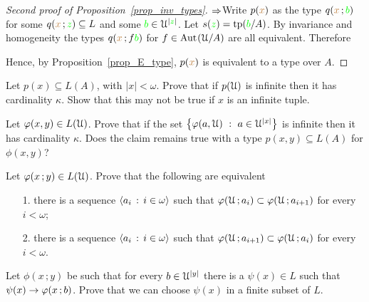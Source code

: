 \documentclass[creche.tex]{subfiles}
\begin{document}
\begin{proof}[Second proof of Proposition~\ref{prop_inv_types}] $\Rightarrow$\quad  Write $p({\color{brown} x})$ as the type $q({\color{brown} x}\,;{\color{green} b})$ for some $q({\color{brown} x}\,;{\color{green} z})\subseteq L$ and some ${\color{green} b}\in\EuScript U^{|{\color{green} z}|}$. Let $s({\color{green} z})={\rm tp}({\color{green} b}/A)$. By invariance and homogeneity the types $q({\color{brown} x}\,;f{\color{green} b})$ for $f\in\textrm{Aut\kern.15ex}(\EuScript U/A)$ are all equivalent. Therefore

\smallskip

\smallskip

\smallskip

Hence, by Proposition~\ref{prop_E_type}, $p({\color{brown} x})$ is equivalent to a type over $A$.
\end{proof}

\begin{exercise}\label{cadinalitafinitasaturazione}
Let $p(x)\subseteq L(A)$, with $|x|<\omega$. Prove that if $p(\EuScript U)$ is infinite then it has cardinality $\kappa$. Show that this may not be true if $x$ is an infinite tuple.\QED 
\end{exercise}

\begin{exercise}\label{cadinalitafinitasaturazioneinsiemi}
Let $\varphi(x,y)\in L(\EuScript U)$. Prove that if the set $\big\{\phi(a,\U)\ :\ a\in\U^{|x|}\big\}$ is infinite then it has cardinality $\kappa$. Does the claim remains true with a type $p(x,y)\subseteq L(A)$ for $\phi(x,y)$?\QED 
\end{exercise}

\begin{exercise} 
Let $\varphi(x\,;y)\in L(\EuScript U)$. Prove that the following are equivalent
\begin{itemize}
\item[1.] there is a sequence $\langle a_i\,:\,i\in\omega\rangle$ such that $\varphi(\EuScript U\,;a_i)\subset\varphi(\EuScript U\,;a_{i+1})$ for every $i<\omega$;
\item[2.] there is a sequence $\langle a_i\,:\,i\in\omega\rangle$ such that $\varphi(\EuScript U\,;a_{i+1})\subset\varphi(\EuScript U\,;a_i)$ for every $i<\omega$.\QED  
\end{itemize}
\end{exercise}

\begin{exercise} 
Let $\phi(x\,;y)$ be such that for every $b\in\EuScript U^{|y|}$ there is a $\psi(x)\in L$ such that $\psi(x)\rightarrow\varphi(x\,;b)$. Prove that we can choose $\psi(x)$ in a finite subset of $L$.\QED
\end{exercise}
\end{document}

